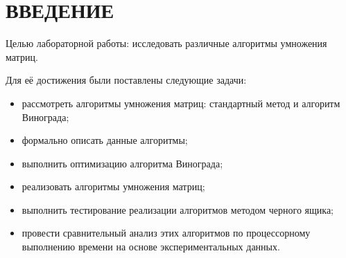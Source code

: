 \part*{ВВЕДЕНИЕ}

Целью лабораторной работы: исследовать различные алгоритмы умножения матриц. 

Для её достижения были поставлены следующие задачи:
\begin{itemize}
	\item рассмотреть алгоритмы умножения матриц: стандартный метод и алгоритм Винограда;
	\item формально описать данные алгоритмы;
	\item выполнить оптимизацию алгоритма Винограда;
	\item реализовать алгоритмы умножения матриц;
	\item выполнить тестирование реализации алгоритмов методом черного ящика;
	\item провести сравнительный анализ этих алгоритмов по процессорному выполнению времени на основе экспериментальных данных.
\end{itemize}